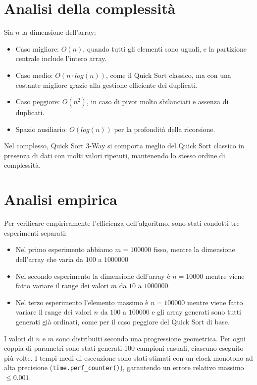 \documentclass[a4paper, 12pt, oneside]{book}
\begin{document}
\section{Analisi della complessità}

Sia \(n\) la dimensione dell'array:

\begin{itemize}
    \item Caso migliore: \(O(n)\), quando tutti gli elementi sono uguali, e la partizione centrale include l'intero array.
    \item Caso medio: \(O(n \cdot log(n))\), come il Quick Sort classico, ma con una costante migliore grazie alla gestione efficiente dei duplicati.
    \item Caso peggiore: \(O(n^2)\), in caso di pivot molto sbilanciati e assenza di duplicati.
    \item Spazio ausiliario: \(O(log(n))\) per la profondità della ricorsione.
\end{itemize}

\noindent Nel complesso, Quick Sort 3-Way si comporta meglio del Quick Sort classico in presenza di dati con molti valori ripetuti, mantenendo lo stesso ordine di complessità.

\section{Analisi empirica}

Per verificare empiricamente l'efficienza dell'algoritmo, sono stati condotti tre esperimenti separati:

\begin{itemize}
    \item Nel primo esperimento abbiamo \(m = 100000\) fisso, mentre la dimensione dell'array che varia da \(100\) a $1000000$
    \item Nel secondo esperimento la dimensione dell'array è \(n = 10000\) mentre viene fatto variare il range dei valori \(m\) da $10$ a $1000000$.
    \item Nel terzo esperimento l'elemento massimo è \(n = 100000\) mentre viene fatto variare il range dei valori \(n\) da $100$ a $100000$ e gli array generati sono tutti generati già ordinati, come per il caso peggiore del Quick Sort di base.
\end{itemize}

\noindent
I valori di \(n\) e \(m\) sono distribuiti secondo una progressione geometrica. Per ogni coppia di parametri sono stati generati 100 campioni casuali, ciascuno eseguito più volte. I tempi medi di esecuzione sono stati stimati con un clock monotono ad alta precisione (\texttt{time.perf\_counter()}), garantendo un errore relativo massimo \(\leq 0.001\). \\
\end{document}
